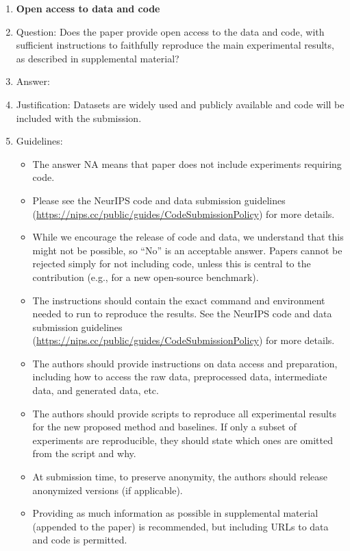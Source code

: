 \documentclass{article}
\begin{document}
\begin{enumerate}
\item {\bf Open access to data and code}
    \item[] Question: Does the paper provide open access to the data and code, with sufficient instructions to faithfully reproduce the main experimental results, as described in supplemental material?
    \item[] Answer: \answerYes{} %
    \item[] Justification: Datasets are widely used and publicly available and code will be included with the submission.
    \item[] Guidelines:
    \begin{itemize}
        \item The answer NA means that paper does not include experiments requiring code.
        \item Please see the NeurIPS code and data submission guidelines (\url{https://nips.cc/public/guides/CodeSubmissionPolicy}) for more details.
        \item While we encourage the release of code and data, we understand that this might not be possible, so “No” is an acceptable answer. Papers cannot be rejected simply for not including code, unless this is central to the contribution (e.g., for a new open-source benchmark).
        \item The instructions should contain the exact command and environment needed to run to reproduce the results. See the NeurIPS code and data submission guidelines (\url{https://nips.cc/public/guides/CodeSubmissionPolicy}) for more details.
        \item The authors should provide instructions on data access and preparation, including how to access the raw data, preprocessed data, intermediate data, and generated data, etc.
        \item The authors should provide scripts to reproduce all experimental results for the new proposed method and baselines. If only a subset of experiments are reproducible, they should state which ones are omitted from the script and why.
        \item At submission time, to preserve anonymity, the authors should release anonymized versions (if applicable).
        \item Providing as much information as possible in supplemental material (appended to the paper) is recommended, but including URLs to data and code is permitted.
    \end{itemize}



\end{enumerate}
\end{document}
